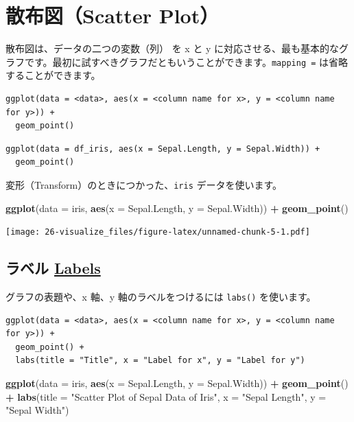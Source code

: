 \documentclass[
  xelatex, ja=standard]{bxjsbook}
\newenvironment{Shaded}{\begin{snugshade}}{\end{snugshade}}
\newcommand{\AttributeTok}[1]{\textcolor[rgb]{0.13,0.29,0.53}{#1}}
\newcommand{\FunctionTok}[1]{\textcolor[rgb]{0.13,0.29,0.53}{\textbf{#1}}}
\newcommand{\NormalTok}[1]{#1}
\newcommand{\SpecialCharTok}[1]{\textcolor[rgb]{0.81,0.36,0.00}{\textbf{#1}}}
\newcommand{\StringTok}[1]{\textcolor[rgb]{0.31,0.60,0.02}{#1}}
\theoremstyle{definition}
\theoremstyle{definition}
\theoremstyle{definition}
\theoremstyle{definition}
\theoremstyle{remark}
\begin{document}
\hypertarget{ux6563ux5e03ux56f3scatter-plot}{%
\section{散布図（Scatter Plot）}\label{ux6563ux5e03ux56f3scatter-plot}}

散布図は、データの二つの変数（列） を x と y に対応させる、最も基本的なグラフです。最初に試すべきグラフだともいうことができます。\texttt{mapping\ =} は省略することができます。

\begin{verbatim}
ggplot(data = <data>, aes(x = <column name for x>, y = <column name for y>)) +
  geom_point()
\end{verbatim}

\begin{verbatim}
ggplot(data = df_iris, aes(x = Sepal.Length, y = Sepal.Width)) +
  geom_point()
\end{verbatim}

変形（Transform）のときにつかった、\texttt{iris} データを使います。

\begin{Shaded}
\begin{Highlighting}[]
\FunctionTok{ggplot}\NormalTok{(}\AttributeTok{data =}\NormalTok{ iris, }\FunctionTok{aes}\NormalTok{(}\AttributeTok{x =}\NormalTok{ Sepal.Length, }\AttributeTok{y =}\NormalTok{ Sepal.Width)) }\SpecialCharTok{+}
  \FunctionTok{geom\_point}\NormalTok{()}
\end{Highlighting}
\end{Shaded}

\texttt{[image: 26-visualize\_files/figure-latex/unnamed-chunk-5-1.pdf]}

\hypertarget{ux30e9ux30d9ux30eb-labels}{%
\subsection{\texorpdfstring{ラベル \href{https://ggplot2.tidyverse.org/reference/labs.html}{Labels}}{ラベル Labels}}\label{ux30e9ux30d9ux30eb-labels}}

グラフの表題や、x 軸、y 軸のラベルをつけるには \texttt{labs()} を使います。

\begin{verbatim}
ggplot(data = <data>, aes(x = <column name for x>, y = <column name for y>)) +
  geom_point() +
  labs(title = "Title", x = "Label for x", y = "Label for y")
\end{verbatim}

\begin{Shaded}
\begin{Highlighting}[]
\FunctionTok{ggplot}\NormalTok{(}\AttributeTok{data =}\NormalTok{ iris, }\FunctionTok{aes}\NormalTok{(}\AttributeTok{x =}\NormalTok{ Sepal.Length, }\AttributeTok{y =}\NormalTok{ Sepal.Width)) }\SpecialCharTok{+}
  \FunctionTok{geom\_point}\NormalTok{() }\SpecialCharTok{+} 
  \FunctionTok{labs}\NormalTok{(}\AttributeTok{title =} \StringTok{"Scatter Plot of Sepal Data of Iris"}\NormalTok{, }\AttributeTok{x =} \StringTok{"Sepal Length"}\NormalTok{, }\AttributeTok{y =} \StringTok{"Sepal Width"}\NormalTok{)}
\end{Highlighting}
\end{Shaded}
\end{document}
